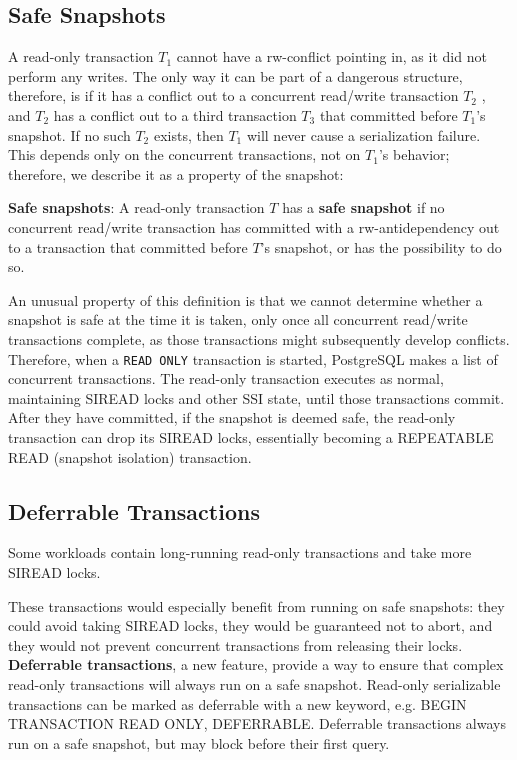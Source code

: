 \documentclass[11pt]{article}
\begin{document}
\subsection{Safe Snapshots}
\label{sec:orge5fe132}
A read-only transaction \(T_1\) cannot have a rw-conflict pointing in, as it did not perform any
writes. The only way it can be part of a dangerous structure, therefore, is if it has a conflict out
to a concurrent read/write transaction \(T_2\) , and \(T_2\) has a conflict out to a third transaction
\(T_3\) that committed before \(T_1\)’s snapshot. If no such \(T_2\) exists, then \(T_1\) will never
cause a serialization failure. This depends only on the concurrent transactions, not on \(T_1\)’s
behavior; therefore, we describe it as a property of the snapshot:

\textbf{Safe snapshots}: A read-only transaction \(T\) has a \textbf{safe snapshot} if no concurrent read/write
transaction has committed with a rw-antidependency out to a transaction that committed before \(T\)'s
snapshot, or has the possibility to do so.

An unusual property of this definition is that we cannot determine whether a snapshot is safe at the
time it is taken, only once all concurrent read/write transactions complete, as those transactions
might subsequently develop conflicts. Therefore, when a \texttt{READ ONLY} transaction is started, PostgreSQL
makes a list of concurrent transactions. The read-only transaction executes as normal, maintaining
SIREAD locks and other SSI state, until those transactions commit. After they have committed, if the
snapshot is deemed safe, the read-only transaction can drop its SIREAD locks, essentially becoming a
REPEATABLE READ (snapshot isolation) transaction.
\subsection{Deferrable Transactions}
\label{sec:org70f8697}
Some workloads contain long-running read-only transactions and take more SIREAD locks.

These transactions would especially benefit from running on safe snapshots: they could avoid taking
SIREAD locks, they would be guaranteed not to abort, and they would not prevent concurrent
transactions from releasing their locks. \textbf{Deferrable transactions}, a new feature, provide a way to
ensure that complex read-only transactions will always run on a safe snapshot. Read-only serializable
transactions can be marked as deferrable with a new keyword, e.g. BEGIN TRANSACTION READ ONLY,
DEFERRABLE. Deferrable transactions always run on a safe snapshot, but may block before their first
query.
\end{document}
